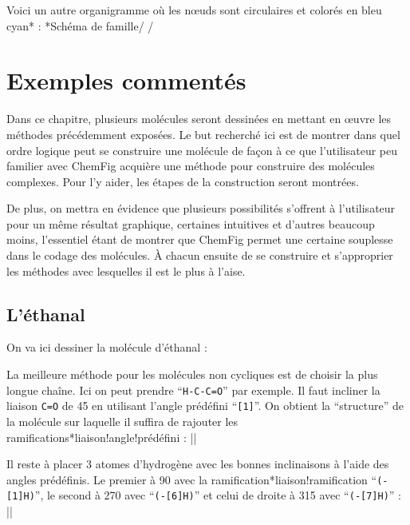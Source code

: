 \documentclass[10pt]{article}
\makeatletter
\newcommand\idx{\@ifstar{\let\print@or@not\@gobble\idx@}{\let\print@or@not\@firstofone\idx@}}
\newcommand\idx@[1]{%
	\ifcat\expandafter\noexpand\@car#1\@nil\relax%
		\expandafter\ifx\@car#1\@nil\protect
			\index{#1}%
			\print@or@not{#1}%
		\else
			\saveexpandmode\expandarg
			\StrSubstitute{\string#1}{\string @}{\@empty\protect\symbol{'100}}[\temp@]%
			\StrGobbleLeft\temp@1[\temp@]%
			\restoreexpandmode
			\expandafter\index\expandafter{\temp@ @\protect\texttt{\protect\textbackslash\temp@}}%
			\print@or@not{\texttt{\string#1}}%
		\fi
	\else
		\index{#1}%
		\print@or@not{#1}%
	\fi
}
\newcommand\make@car@active[1]{%
	\catcode`#1\active
	\begingroup
		\lccode`\~`#1\relax
		\lowercase{\endgroup\def~}%
}
\newif\if@exstar
\newcommand\exemple{%
	\begingroup
	\parskip\z@
	\@makeother\;\@makeother\!\@makeother\?\@makeother\:%
	\@ifstar{\@exstartrue\exemple@}{\@exstarfalse\exemple@}}
\newcommand\exemple@[2][65]{%
	\medbreak\noindent
	\begingroup
		\let\do\@makeother\dospecials
		\make@car@active\ { {}}%
		\make@car@active\^^M{\par\leavevmode}%
		\make@car@active\,{\leavevmode\kern\z@\string,}%
		\make@car@active\-{\leavevmode\kern\z@\string-}%
		\make@car@active\>{\leavevmode\kern\z@\string>}%
		\make@car@active\<{\leavevmode\kern\z@\string<}%
		\exemple@@{#1}{#2}%
}
\newcommand\exemple@@[3]{%
	\def\@tempa##1#3{\exemple@@@{#1}{#2}{##1}}%
	\@tempa
}
\newcommand\exemple@@@[3]{%
	\xdef\the@code{#3}%
	\endgroup
	\if@exstar
		\begingroup
			\fboxrule0.4pt
			\let\breakboxparindent\z@
			\def\bkvz@bottom{\hrule\@height\fboxrule}%
			\let\bkvz@before@breakbox\relax
			\def\bkvz@set@linewidth{\advance\linewidth\dimexpr-2\fboxrule-2\fboxsep}%
			\def\bkvz@left{\vrule\@width\fboxrule\hskip\fboxsep}%
			\def\bkvz@right{\hskip\fboxsep\vrule\@width\fboxrule}%
			\def\bkvz@top{\hbox to \hsize{%
				\vrule\@width\fboxrule\@height\fboxrule
				\leaders\bkvz@bottom\hfill
				\ECFAugie
				\fboxsep\z@
				\colorbox{black}{\kern0.25em\color{white}\footnotesize\lower0.5ex\hbox{\strut#2}\kern0.25em}%
				\leaders\bkvz@bottom\hfill
				\vrule\@width\fboxrule\@height\fboxrule}}%
			\breakbox
				\kern.5ex\relax
				\ttfamily\footnotesize\the@code\par
				\normalfont
				\kern3pt
				\hrule height0.1pt width\linewidth depth0.1pt
				\vskip5pt
				\rightskip0pt plus 1fill
				\everypar{{\color{lightgray}\rlap{\vrule height0.1pt width\linewidth depth0.1pt}}\hskip0pt plus 1fill}%
				\newlinechar`\^^M\everyeof{\noexpand}\scantokens{#3}\par
			\endbreakbox
		\endgroup
	\else
		\vskip0.5ex
		\boxput*(0,1)
			{\fboxsep\z@
			\hbox{\ECFAugie\colorbox{black}{\leavevmode\kern0.25em{\color{white}\footnotesize\strut#2}\kern0.25em}}%
			}%
			{\fboxsep5pt
			\fbox{%
				$\vcenter{\hsize\dimexpr0.#1\linewidth-\fboxsep-\fboxrule\relax
					\kern5pt\parskip0pt \ttfamily\footnotesize\the@code}%
				\vcenter{\kern5pt\hsize\dimexpr\linewidth-0.#1\linewidth-\fboxsep-\fboxrule\relax
					\everypar{{\color{lightgray}\rlap{\vrule height0.1pt width\dimexpr\linewidth-0.#1\linewidth-\fboxsep-\fboxrule depth0.1pt}}}%
					\footnotesize\newlinechar`\^^M\everyeof{\noexpand}\scantokens{#3}}$%
				}%
			}%
	\fi
	\medbreak
	\endgroup
}
\let\do\@makeother\dospecials
\newcommand\CF{{\ECFAugie ChemFig}\xspace}
\makeatother
\begin{document}
Voici un autre organigramme où les nœuds sont circulaires et colorés en bleu cyan\idx*{\printatom} :
\exemple*{Schéma de famille}/
\setbondoffset{0pt}
\setatomsep{80pt}
\renewcommand\printatom[1]{\textsf{#1}}
/

\section{Exemples commentés}\label{exemples.commentes}
Dans ce chapitre, plusieurs molécules seront dessinées en mettant en œuvre les méthodes précédemment exposées. Le but recherché ici est de montrer dans quel ordre logique peut se construire une molécule de façon à ce que l'utilisateur peu familier avec \CF acquière une méthode pour construire des molécules complexes. Pour l'y aider, les étapes de la construction seront montrées.

De plus, on mettra en évidence que plusieurs possibilités s'offrent à l'utilisateur pour un même résultat graphique, certaines intuitives et d'autres beaucoup moins, l'essentiel étant de montrer que \CF permet une certaine souplesse dans le codage des molécules. À chacun ensuite de se construire et s'approprier les méthodes avec lesquelles il est le plus à l'aise.

\subsection{L'éthanal}
On va ici dessiner la molécule d'éthanal : 

La meilleure méthode pour les molécules non cycliques est de choisir la plus longue chaîne. Ici on peut prendre ``\verb|H-C-C=O|'' par exemple. Il faut incliner la liaison \verb|C=O| de 45\degres{} en utilisant l'angle prédéfini ``\verb-[1]-''. On obtient la ``structure'' de la molécule sur laquelle il suffira de rajouter les ramifications\idx*{liaison!angle!prédéfini} :
\exemple{Structure de l'éthanal}||

Il reste à placer 3 atomes d'hydrogène avec les bonnes inclinaisons à l'aide des angles prédéfinis. Le premier à 90\degres{} avec la ramification\idx*{liaison!ramification} ``\verb/(-[1]H)/'', le second à 270\degres{} avec ``\verb/(-[6]H)/'' et celui de droite à 315\degres{} avec ``\verb/(-[7]H)/'' :
\exemple{Ethanal}||
\end{document}
